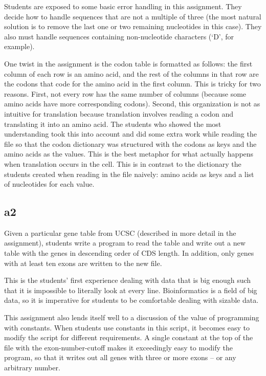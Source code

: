 \documentclass{report}
\begin{document}
Students are exposed to some basic error handling in this assignment. They decide how to handle sequences that are not a multiple of three (the most natural solution is to remove the last one or two remaining nucleotides in this case). They also must handle sequences containing non-nucleotide characters (`D', for example).

One twist in the assignment is the codon table is formatted as follows: the first column of each row is an amino acid, and the rest of the columns in that row are the codons that code for the amino acid in the first column. This is tricky for two reasons. First, not every row has the same number of columns (because some amino acids have more corresponding codons). Second, this organization is not as intuitive for translation because translation involves reading a codon and translating it into an amino acid. The students who showed the most understanding took this into account and did some extra work while reading the file so that the codon dictionary was structured with the codons as keys and the amino acids as the values. This is the best metaphor for what actually happens when translation occurs in the cell. This is in contrast to the dictionary the students created when reading in the file naively: amino acids as keys and a list of nucleotides for each value.

\subsection{a2}
Given a particular gene table from UCSC \cite{karolchik2003ucsc} (described in more detail in the assignment), students write a program to read the table and write out a new table with the genes in descending order of CDS length. In addition, only genes with at least ten exons are written to the new file. 

This is the students' first experience dealing with data that is big enough such that it is impossible to literally look at every line. Bioinformatics is a field of big data, so it is imperative for students to be comfortable dealing with sizable data.

This assignment also lends itself well to a discussion of the value of programming with constants. When students use constants in this script, it becomes easy to modify the script for different requirements. A single constant at the top of the file with the exon-number-cutoff makes it exceedingly easy to modify the program, so that it writes out all genes with three or more exons -- or any arbitrary number.
\end{document}
